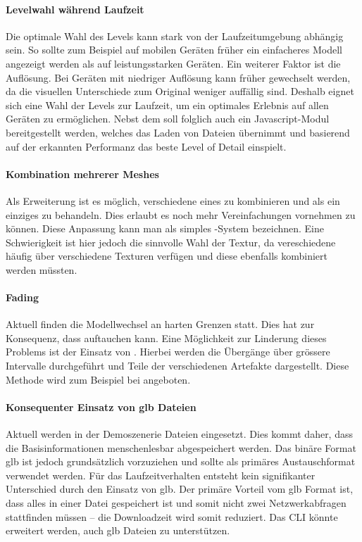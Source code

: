 \paragraph{Levelwahl während Laufzeit}
Die optimale Wahl des Levels kann stark von der Laufzeitumgebung abhängig sein. So sollte zum Beispiel auf mobilen Geräten früher ein einfacheres Modell angezeigt werden als auf leistungsstarken Geräten. Ein weiterer Faktor ist die Auflösung. Bei Geräten mit niedriger Auflösung kann früher gewechselt werden, da die visuellen Unterschiede zum Original weniger auffällig sind.
Deshalb eignet sich eine Wahl der Levels zur Laufzeit, um ein optimales Erlebnis auf allen Geräten zu ermöglichen.
Nebst dem  soll folglich auch ein Javascript-Modul bereitgestellt werden, welches das Laden von  Dateien übernimmt und basierend auf der erkannten Performanz das beste Level of Detail einspielt.

\paragraph{Kombination mehrerer Meshes}
Als Erweiterung ist es möglich, verschiedene  eines  zu kombinieren und als ein einziges  zu behandeln. Dies erlaubt es noch mehr Vereinfachungen vornehmen zu können. Diese Anpassung kann man als simples -System bezeichnen. Eine Schwierigkeit ist hier jedoch die sinnvolle Wahl der Textur, da vereschiedene  häufig über verschiedene Texturen verfügen und diese ebenfalls kombiniert werden müssten.

\paragraph{Fading}
\label{chap:fading}
Aktuell finden die Modellwechsel an harten Grenzen statt. Dies hat zur Konsequenz, dass  auftauchen kann. Eine Möglichkeit zur Linderung dieses Problems ist der Einsatz von . Hierbei werden die Übergänge über grössere Intervalle durchgeführt und Teile der verschiedenen Artefakte dargestellt. Diese Methode wird zum Beispiel bei  angeboten.

\paragraph{Konsequenter Einsatz von glb Dateien}
Aktuell werden in der Demoszenerie  Dateien eingesetzt. Dies kommt daher, dass die Basisinformationen menschenlesbar abgespeichert werden. Das binäre Format glb ist jedoch grundsätzlich  vorzuziehen und sollte als primäres Austauschformat verwendet werden. Für das Laufzeitverhalten entsteht kein signifikanter Unterschied durch den Einsatz von glb. Der primäre Vorteil vom glb Format ist, dass alles in einer Datei gespeichert ist und somit nicht zwei Netzwerkabfragen stattfinden müssen – die Download\-zeit wird somit reduziert. Das CLI könnte erweitert werden, auch glb Dateien zu unterstützen.
